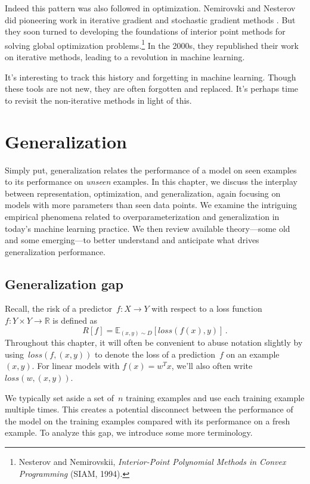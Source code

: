 \documentclass{tufte-book}
\begin{document}
Indeed this pattern was also followed in optimization. Nemirovski and
Nesterov did pioneering work in iterative gradient and stochastic
gradient methods . But they soon turned to developing the foundations of
interior point methods for solving global optimization
problems.\footnote{Nesterov and Nemirovskii, \emph{Interior-Point
  Polynomial Methods in Convex Programming} (SIAM, 1994).} In the 2000s,
they republished their work on iterative methods, leading to a
revolution in machine learning.

It's interesting to track this history and forgetting in machine
learning. Though these tools are not new, they are often forgotten and
replaced. It's perhaps time to revisit the non-iterative methods in
light of this.

\chapter{Generalization}

Simply put, generalization relates the performance of a model on seen
examples to its performance on \emph{unseen} examples. In this chapter,
we discuss the interplay between representation, optimization, and
generalization, again focusing on models with more parameters than seen
data points. We examine the intriguing empirical phenomena related to
overparameterization and generalization in today's machine learning
practice. We then review available theory---some old and some
emerging---to better understand and anticipate what drives
generalization performance.

\hypertarget{generalization-gap}{%
\section{Generalization gap}\label{generalization-gap}}


Recall, the risk of a predictor~\(f\colon X\to Y\) with respect to a
loss function~\(f\colon Y\times Y\to\mathbb{R}\) is defined as \[
R[f] = \mathbb{E}_{(x, y)\sim D}\left[\mathit{loss}(f(x), y)\right]\,.
\] Throughout this chapter, it will often be convenient to abuse
notation slightly by using~\(\mathit{loss}(f,(x,y))\) to denote the loss
of a prediction~\(f\) on an example~\((x,y)\). For linear models with
\(f(x)= w^Tx\), we'll also often write~\(\mathit{loss}(w,(x,y))\).

We typically set aside a set of~\(n\) training examples and use each
training example multiple times. This creates a potential disconnect
between the performance of the model on the training examples compared
with its performance on a fresh example. To analyze this gap, we
introduce some more terminology.
\end{document}
